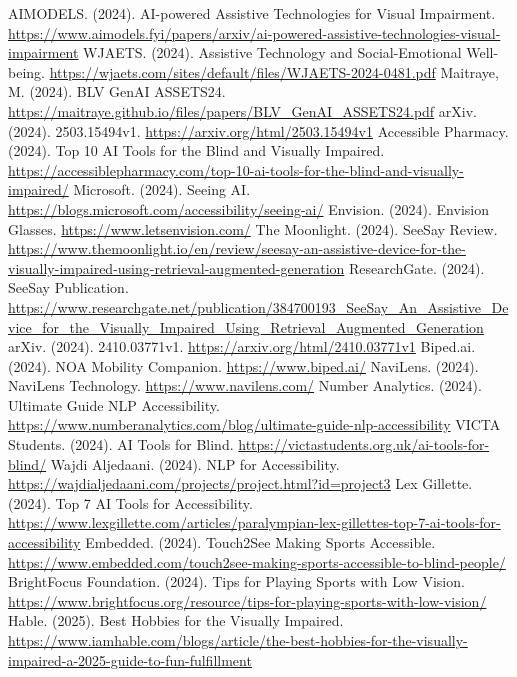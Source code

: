 \begin{thebibliography}{99}
 AIMODELS. (2024). AI-powered Assistive Technologies for Visual Impairment. \url{https://www.aimodels.fyi/papers/arxiv/ai-powered-assistive-technologies-visual-impairment}
 WJAETS. (2024). Assistive Technology and Social-Emotional Well-being. \url{https://wjaets.com/sites/default/files/WJAETS-2024-0481.pdf}
 Maitraye, M. (2024). BLV GenAI ASSETS24. \url{https://maitraye.github.io/files/papers/BLV_GenAI_ASSETS24.pdf}
 arXiv. (2024). 2503.15494v1. \url{https://arxiv.org/html/2503.15494v1}
 Accessible Pharmacy. (2024). Top 10 AI Tools for the Blind and Visually Impaired. \url{https://accessiblepharmacy.com/top-10-ai-tools-for-the-blind-and-visually-impaired/}
 Microsoft. (2024). Seeing AI. \url{https://blogs.microsoft.com/accessibility/seeing-ai/}
 Envision. (2024). Envision Glasses. \url{https://www.letsenvision.com/}
 The Moonlight. (2024). SeeSay Review. \url{https://www.themoonlight.io/en/review/seesay-an-assistive-device-for-the-visually-impaired-using-retrieval-augmented-generation}
 ResearchGate. (2024). SeeSay Publication. \url{https://www.researchgate.net/publication/384700193_SeeSay_An_Assistive_Device_for_the_Visually_Impaired_Using_Retrieval_Augmented_Generation}
 arXiv. (2024). 2410.03771v1. \url{https://arxiv.org/html/2410.03771v1}
 Biped.ai. (2024). NOA Mobility Companion. \url{https://www.biped.ai/}
 NaviLens. (2024). NaviLens Technology. \url{https://www.navilens.com/}
 Number Analytics. (2024). Ultimate Guide NLP Accessibility. \url{https://www.numberanalytics.com/blog/ultimate-guide-nlp-accessibility}
 VICTA Students. (2024). AI Tools for Blind. \url{https://victastudents.org.uk/ai-tools-for-blind/}
 Wajdi Aljedaani. (2024). NLP for Accessibility. \url{https://wajdialjedaani.com/projects/project.html?id=project3}
 Lex Gillette. (2024). Top 7 AI Tools for Accessibility. \url{https://www.lexgillette.com/articles/paralympian-lex-gillettes-top-7-ai-tools-for-accessibility}
 Embedded. (2024). Touch2See Making Sports Accessible. \url{https://www.embedded.com/touch2see-making-sports-accessible-to-blind-people/}
 BrightFocus Foundation. (2024). Tips for Playing Sports with Low Vision. \url{https://www.brightfocus.org/resource/tips-for-playing-sports-with-low-vision/}
 Hable. (2025). Best Hobbies for the Visually Impaired. \url{https://www.iamhable.com/blogs/article/the-best-hobbies-for-the-visually-impaired-a-2025-guide-to-fun-fulfillment}
\end{thebibliography}
